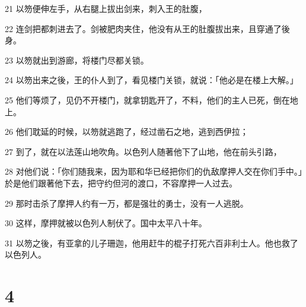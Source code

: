 \par 21 以笏便伸左手，从右腿上拔出剑来，刺入王的肚腹，
\par 22 连剑把都刺进去了。剑被肥肉夹住，他没有从王的肚腹拔出来，且穿通了後身。
\par 23 以笏就出到游廊，将楼门尽都关锁。
\par 24 以笏出来之後，王的仆人到了，看见楼门关锁，就说：「他必是在楼上大解。」
\par 25 他们等烦了，见仍不开楼门，就拿钥匙开了，不料，他们的主人已死，倒在地上。
\par 26 他们耽延的时候，以笏就逃跑了，经过凿石之地，逃到西伊拉；
\par 27 到了，就在以法莲山地吹角。以色列人随著他下了山地，他在前头引路，
\par 28 对他们说：「你们随我来，因为耶和华已经把你们的仇敌摩押人交在你们手中。」於是他们跟著他下去，把守约但河的渡口，不容摩押一人过去。
\par 29 那时击杀了摩押人约有一万，都是强壮的勇士，没有一人逃脱。
\par 30 这样，摩押就被以色列人制伏了。国中太平八十年。
\par 31 以笏之後，有亚拿的儿子珊迦，他用赶牛的棍子打死六百非利士人。他也救了以色列人。

\chapter{4}


